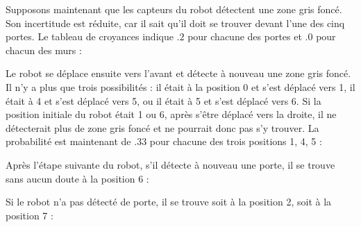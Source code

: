 Supposons maintenant que les capteurs du robot détectent une zone gris foncé. Son incertitude est réduite, car il sait qu'il doit se trouver devant l'une des cinq portes. Le tableau de croyances indique $.2$ pour chacune des portes et $.0$ pour chacun des murs :
\begin{center}
\end{center}
Le robot se déplace ensuite vers l'avant et détecte à nouveau une zone gris foncé. Il n'y a plus que trois possibilités : il était à la position 0 et s'est déplacé vers 1, il était à 4 et s'est déplacé vers 5, ou il était à 5 et s'est déplacé vers 6. Si la position initiale du robot était 1 ou 6, après s'être déplacé vers la droite, il ne détecterait plus de zone gris foncé et ne pourrait donc pas s'y trouver. La probabilité est maintenant de $.33$ pour chacune des trois positions 1, 4, 5 :
\begin{center}
\end{center}
Après l'étape suivante du robot, s'il détecte à nouveau une porte, il se trouve sans aucun doute à la position 6 :
\begin{center}
\end{center}
\noindent{}Si le robot n'a pas détecté de porte, il se trouve soit à la position 2, soit à la position 7 :
